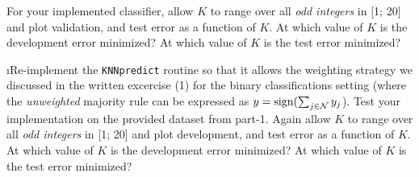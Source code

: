 \documentclass[fleqn]{article}
\begin{document}
For your implemented classifier, allow $K$ to range over all \textit{odd integers} 
in [1; 20] and plot validation, and test error as a function of $K$. At which 
value of $K$ is the development error minimized? At which value of $K$ is the test 
error minimized?

\i Re-implement the \texttt{KNNpredict} routine so that it allows the weighting strategy 
we discussed in the written excercise (1) for the binary classifications setting
(where the \textit{unweighted} majority rule can be expressed as $y = \textrm{sign}(\sum_{j 
\in \mathcal{N}} y_j$). Test your implementation on the provided dataset from part-1. 
Again allow $K$ to range over all \textit{odd integers} in [1; 20] and plot development, 
and test error as a function of $K$. At which value of $K$ is the development error 
minimized? At which value of $K$ is the test error minimized?

\ene
\end{document}
